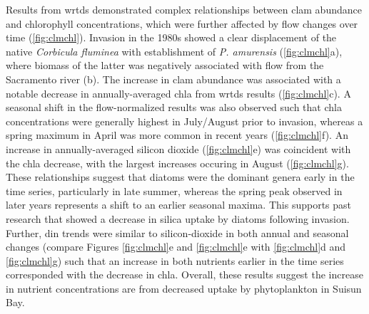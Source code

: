 \documentclass[journal = esthag, manuscript = article]{achemso}\usepackage[]{graphicx}\usepackage[]{color}
\begin{document}
Results from \ac{wrtds} demonstrated complex relationships between clam abundance and chlorophyll concentrations, which were further affected by flow changes over time (\cref{fig:clmchl}).  Invasion in the 1980s showed a clear displacement of the native \textit{Corbicula fluminea} with establishment of \textit{P. amurensis} (\cref{fig:clmchl}a), where biomass of the latter was negatively associated with flow from the Sacramento river (b).  The increase in clam abundance was associated with a notable decrease in annually-averaged \ac{chla} from \ac{wrtds} results (\cref{fig:clmchl}c).  A seasonal shift in the flow-normalized results was also observed such that \ac{chla} concentrations were generally highest in July/August prior to invasion, whereas a spring maximum in April was more common in recent years (\cref{fig:clmchl}f).  An increase in annually-averaged silicon dioxide (\cref{fig:clmchl}e) was coincident with the \ac{chla} decrease, with the largest increases occuring in August (\cref{fig:clmchl}g).  These relationships suggest that diatoms were the dominant genera early in the time series, particularly in late summer, whereas the spring peak observed in later years represents a shift to an earlier seasonal maxima.  This supports past research that showed a decrease in silica uptake by diatoms following invasion.\cite{Cloern96,Kimmerer05} Further, \ac{din} trends were similar to silicon-dioxide in both annual and seasonal changes (compare Figures \ref{fig:clmchl}e and \ref{fig:clmchl}e with \ref{fig:clmchl}d and \ref{fig:clmchl}g) such that an increase in both nutrients earlier in the time series corresponded with the decrease in \ac{chla}.  Overall, these results suggest the increase in nutrient concentrations are from decreased uptake by phytoplankton in Suisun Bay.
\end{document}
